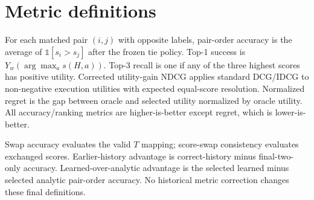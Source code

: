 \section{Metric definitions}\label{app:metrics}
For each matched pair $(i,j)$ with opposite labels, pair-order accuracy is the average of $\mathbb{1}[s_i>s_j]$ after the frozen tie policy. Top-1 success is $Y_w(\arg\max_a s(H,a))$. Top-3 recall is one if any of the three highest scores has positive utility. Corrected utility-gain NDCG applies standard DCG/IDCG to non-negative execution utilities with expected equal-score resolution. Normalized regret is the gap between oracle and selected utility normalized by oracle utility. All accuracy/ranking metrics are higher-is-better except regret, which is lower-is-better.

Swap accuracy evaluates the valid $T$ mapping; score-swap consistency evaluates exchanged scores. Earlier-history advantage is correct-history minus final-two-only accuracy. Learned-over-analytic advantage is the selected learned minus selected analytic pair-order accuracy. No historical metric correction changes these final definitions.
